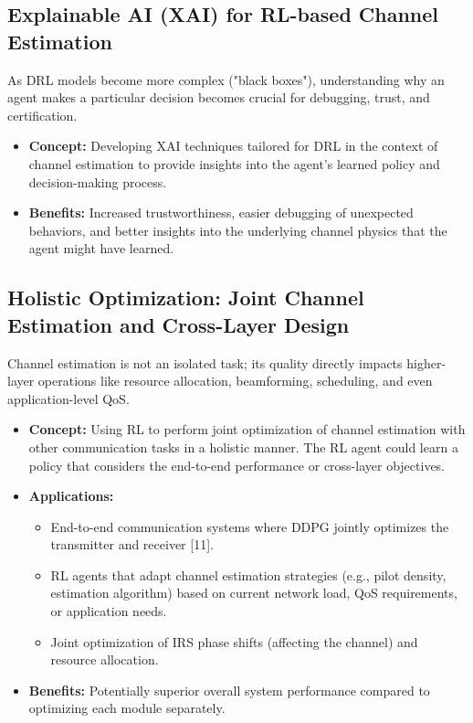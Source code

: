 \documentclass[journal,twocolumn]{IEEEtran}
\begin{document}
\subsection{Explainable AI (XAI) for RL-based Channel Estimation}
As DRL models become more complex ("black boxes"), understanding why an agent makes a particular decision becomes crucial for debugging, trust, and certification.
\begin{itemize}
    \item \textbf{Concept:} Developing XAI techniques tailored for DRL in the context of channel estimation to provide insights into the agent's learned policy and decision-making process.
    \item \textbf{Benefits:} Increased trustworthiness, easier debugging of unexpected behaviors, and better insights into the underlying channel physics that the agent might have learned.
\end{itemize}

\subsection{Holistic Optimization: Joint Channel Estimation and Cross-Layer Design}
Channel estimation is not an isolated task; its quality directly impacts higher-layer operations like resource allocation, beamforming, scheduling, and even application-level QoS.
\begin{itemize}
    \item \textbf{Concept:} Using RL to perform joint optimization of channel estimation with other communication tasks in a holistic manner. The RL agent could learn a policy that considers the end-to-end performance or cross-layer objectives.
    \item \textbf{Applications:}
        \begin{itemize}
            \item End-to-end communication systems where DDPG jointly optimizes the transmitter and receiver [11].
            \item RL agents that adapt channel estimation strategies (e.g., pilot density, estimation algorithm) based on current network load, QoS requirements, or application needs.
            \item Joint optimization of IRS phase shifts (affecting the channel) and resource allocation.
        \end{itemize}
    \item \textbf{Benefits:} Potentially superior overall system performance compared to optimizing each module separately.
\end{itemize}
\end{document}

